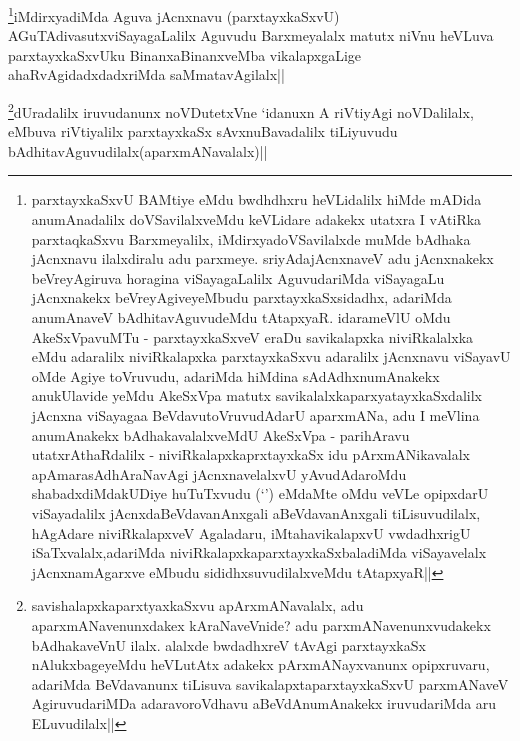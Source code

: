 \begin{artha}
\footnote{parxtayxkaSxvU BAMtiye eMdu bwdhdhxru heVLidalilx hiMde mADida anumAnadalilx doVSavilalxveMdu keVLidare adakekx utatxra I vAtiRka parxtaqkaSxvu Barxmeyalilx, iMdirxyadoVSavilalxde muMde bAdhaka jAcnxnavu ilalxdiralu adu parxmeye. sriyAdajAcnxnaveV adu jAcnxnakekx beVreyAgiruva horagina viSayagaLalilx AguvudariMda viSayagaLu jAcnxnakekx beVreyAgiveyeMbudu parxtayxkaSxsidadhx, adariMda anumAnaveV bAdhitavAguvudeMdu tAtapxyaR. idarameVlU oMdu AkeSxVpavuMTu - parxtayxkaSxveV eraDu savikalapxka niviRkalalxka eMdu adaralilx niviRkalapxka parxtayxkaSxvu adaralilx jAcnxnavu viSayavU oMde Agiye toVruvudu, adariMda hiMdina sAdAdhxnumAnakekx anukUlavide yeMdu AkeSxVpa matutx savikalalxkaparxyatayxkaSxdalilx jAcnxna viSayagaa BeVdavutoVruvudAdarU aparxmANa, adu I meVlina anumAnakekx bAdhakavalalxveMdU AkeSxVpa - parihAravu utatxrAthaRdalilx - niviRkalapxkaprxtayxkaSx idu pArxmANikavalalx apAmarasAdhAraNavAgi jAcnxnavelalxvU yAvudAdaroMdu shabadxdiMdakUDiye huTuTxvudu (`\stext') eMdaMte oMdu veVLe opipxdarU viSayadalilx jAcnxdaBeVdavanAnxgali aBeVdavanAnxgali tiLisuvudilalx, hAgAdare niviRkalapxveV Agaladaru, iMtahavikalapxvU vwdadhxrigU iSaTxvalalx,adariMda niviRkalapxkaparxtayxkaSxbaladiMda viSayavelalx jAcnxnamAgarxve eMbudu sididhxsuvudilalxveMdu tAtapxyaR||}iMdirxyadiMda Aguva jAcnxnavu (parxtayxkaSxvU) AGuTAdivasutxviSayagaLalilx Aguvudu Barxmeyalalx matutx niVnu heVLuva parxtayxkaSxvUku BinanxaBinanxveMba vikalapxgaLige ahaRvAgidadxdadxriMda saMmatavAgilalx||
\end{artha}

\begin{artha}
\footnote{savishalapxkaparxtyaxkaSxvu apArxmANavalalx, adu  aparxmANavenunxdakex kAraNaveVnide? adu parxmANavenunxvudakekx bAdhakaveVnU ilalx. alalxde bwdadhxreV tAvAgi parxtayxkaSx nAlukxbageyeMdu heVLutAtx adakekx pArxmANayxvanunx opipxruvaru, adariMda BeVdavanunx tiLisuva savikalapxtaparxtayxkaSxvU parxmANaveV AgiruvudariMDa adaravoroVdhavu aBeVdAnumAnakekx iruvudariMda aru ELuvudilalx||}dUradalilx iruvudanunx noVDutetxVne `idanuxn A riVtiyAgi noVDalilalx, eMbuva riVtiyalilx parxtayxkaSx sAvxnuBavadalilx tiLiyuvudu bAdhitavAguvudilalx(aparxmANavalalx)||
\end{artha}


